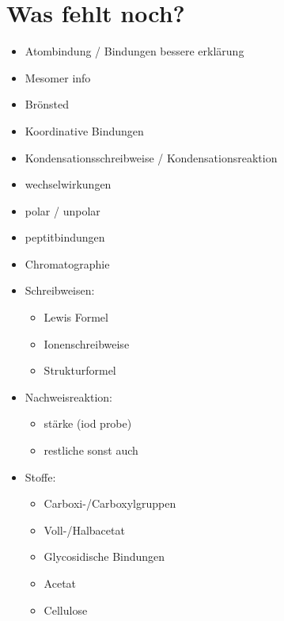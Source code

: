 
\chapter{Was fehlt noch?}
\begin{itemize}
    \item Atombindung / Bindungen bessere erklärung
    \item Mesomer info
    \item Brönsted
    \item Koordinative Bindungen
    \item Kondensationsschreibweise / Kondensationsreaktion
    \item wechselwirkungen
    \item polar / unpolar
    \item peptitbindungen
    \item Chromatographie

    \item Schreibweisen:
    \begin{itemize}
        \item Lewis Formel
        \item Ionenschreibweise
        \item Strukturformel
    \end{itemize}

    \item Nachweisreaktion:
    \begin{itemize}
        \item stärke (iod probe)
        \item restliche sonst auch
    \end{itemize}

    \item Stoffe:
    \begin{itemize}
        \item Carboxi-/Carboxylgruppen
        \item Voll-/Halbacetat
        \item Glycosidische Bindungen
        \item Acetat
        \item Cellulose
    \end{itemize}
\end{itemize}

